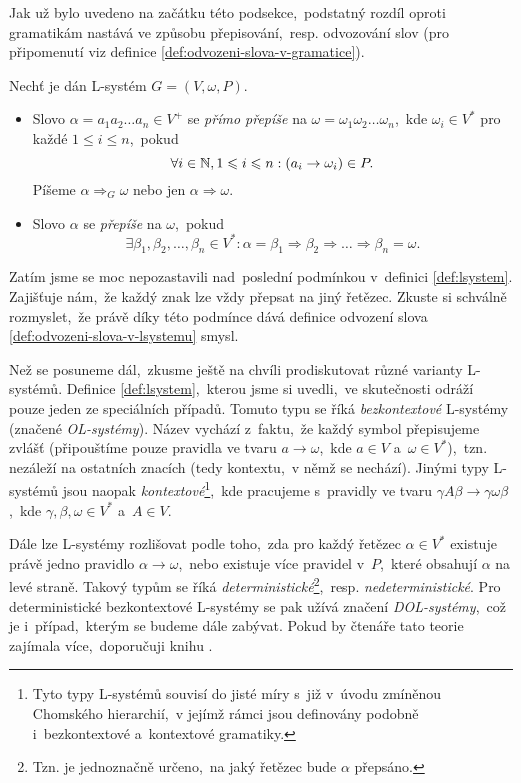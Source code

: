 Jak už bylo uvedeno na začátku této podsekce,~podstatný rozdíl oproti gramatikám nastává ve způsobu přepisování,~resp. odvozování slov (pro připomenutí viz definice \ref{def:odvozeni-slova-v-gramatice}).
\begin{definition}\label{def:odvozeni-slova-v-lsystemu}
    Nechť je dán L-systém $G=(V,\omega,P)$.
    \begin{itemize}
        \item Slovo $\alpha=a_1a_2\ldots a_n\in V^+$ se \emph{přímo přepíše} na $\omega=\omega_1\omega_2\ldots\omega_n$,~kde $\omega_i\in V^*$ pro každé $1\leqslant i\leqslant n$,~pokud
        \[\forall i\in\mathbb{N},1\leqslant i\leqslant n: (a_i\to\omega_i)\in P.\]
        Píšeme $\alpha\Rightarrow_G\omega$ nebo jen $\alpha\Rightarrow\omega$.
        \item Slovo $\alpha$ se \emph{přepíše} na $\omega$,~pokud
        \[\exists\beta_1,\beta_2,\ldots,\beta_n\in V^*:\alpha=\beta_1\Rightarrow\beta_2\Rightarrow\dots\Rightarrow\beta_n=\omega.\]
    \end{itemize}
\end{definition}
Zatím jsme se moc nepozastavili nad~poslední podmínkou v~definici \ref{def:lsystem}. Zajišťuje nám,~že každý znak lze vždy přepsat na jiný řetězec. Zkuste si schválně rozmyslet,~že právě díky této podmínce dává definice odvození slova \ref{def:odvozeni-slova-v-lsystemu} smysl.

Než se posuneme dál,~zkusme ještě na chvíli prodiskutovat různé varianty L-systémů. Definice \ref{def:lsystem},~kterou jsme si uvedli,~ve skutečnosti odráží pouze jeden ze speciálních případů. Tomuto typu se říká \emph{bezkontextové} L-systémy (značené \emph{OL-systémy}). Název vychází z~faktu,~že každý symbol přepisujeme zvlášť (připouštíme pouze pravidla ve tvaru $a\to\omega$,~kde $a\in V$ a~$\omega\in V^*$),~tzn. nezáleží na ostatních znacích (tedy kontextu,~v němž se nechází). Jinými typy L-systémů jsou naopak \emph{kontextové}\footnote{Tyto typy L-systémů souvisí do jisté míry s~již v~úvodu zmíněnou Chomského hierarchií,~v jejímž rámci jsou definovány podobně i~bezkontextové a~kontextové gramatiky.},~kde pracujeme s~pravidly ve tvaru $\gamma A\beta\to\gamma\omega\beta$,~kde $\gamma,\beta,\omega\in V^*$ a~$A\in V$.

Dále lze L-systémy rozlišovat podle toho,~zda pro každý řetězec $\alpha\in V^*$ existuje právě jedno pravidlo $\alpha\to\omega$,~nebo existuje více pravidel v~$P$,~které obsahují $\alpha$ na levé straně. Takový typům se říká \emph{deterministické}\footnote{Tzn. je jednoznačně určeno,~na jaký řetězec bude $\alpha$ přepsáno.},~resp. \emph{nedeterministické}. Pro deterministické bezkontextové L-systémy se pak užívá značení \emph{DOL-systémy},~což je i~případ,~kterým se budeme dále zabývat. Pokud by čtenáře tato teorie zajímala více,~doporučuji knihu \cite{Prusinkiewicz1990}.

